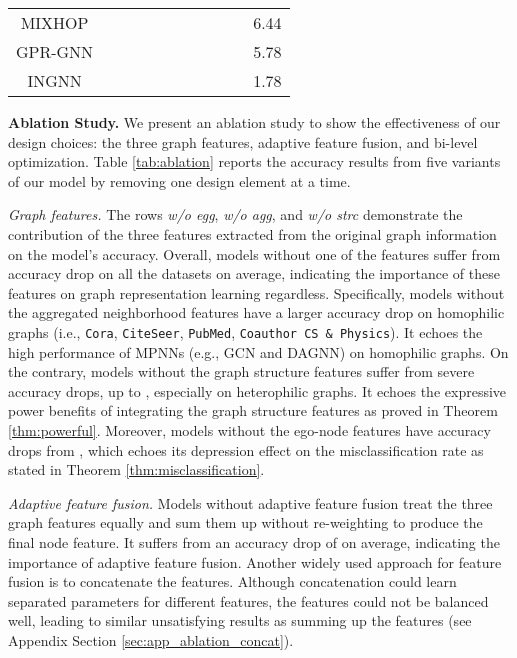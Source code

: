 \documentclass{article}
\theoremstyle{plain}
\newcommand{\pjn}{{INGNN}}
\newcommand{\mypar}[1]{{\vspace{0.05cm} \noindent \bf #1}}
\begin{document}
\begin{table*}[htb]
\begin{tabular}{c|ccccccccc|c}
MIXHOP    &     &     &     &  &     &     &     &     &     &  6.44      \\
GPR-GNN   &     &     &     &     &     & {\color[HTML]{0000FF} }    &     &     & {\color[HTML]{FF0000} } &   5.78     \\
\midrule
\pjn  &{\color[HTML]{FF0000} } & {\color[HTML]{0000FF} } & {\color[HTML]{0000FF} } &     & {\color[HTML]{FF0000} } & {\color[HTML]{FF0000} } & {\color[HTML]{FF0000} } & {\color[HTML]{FF0000} } & {\color[HTML]{0000FF} } & 1.78 \\
\bottomrule
\end{tabular}
\vspace{-10pt}
\end{table*}
  
\mypar{Ablation Study.} 
We present an ablation study to show the effectiveness of our design choices: the three graph features, adaptive feature fusion, and bi-level optimization. 
Table \ref{tab:ablation} reports the accuracy results from five variants of our model by removing one design element at a time. 


\textit{Graph features.} The rows \textit{w/o egg}, \textit{w/o agg}, and \textit{w/o strc} demonstrate the contribution of the three features extracted from the original graph information on the model's accuracy.
Overall, models without one of the features suffer from  accuracy drop on all the datasets on average, indicating the importance of these features on graph representation learning regardless.
Specifically, models without the aggregated neighborhood features have a larger accuracy drop on homophilic graphs (i.e., \texttt{Cora}, \texttt{CiteSeer}, \texttt{PubMed}, \texttt{Coauthor CS \& Physics}). It echoes the high performance of MPNNs (e.g., GCN and DAGNN) on homophilic graphs. 
On the contrary, models without the graph structure features suffer from severe accuracy drops, up to , especially on heterophilic graphs. It echoes the expressive power benefits of integrating the graph structure features as proved in Theorem \ref{thm:powerful}.   
Moreover, models without the ego-node features have accuracy drops from , which echoes its depression effect on the misclassification rate as stated in Theorem \ref{thm:misclassification}.

\textit{Adaptive feature fusion.} Models without adaptive feature fusion treat the three graph features equally and sum them up without re-weighting to produce the final node feature. It suffers from an accuracy drop of  on average, indicating the importance of adaptive feature fusion. Another widely used approach for feature fusion is to concatenate the features. Although concatenation could learn separated parameters for different features, the features could not be balanced well, leading to similar unsatisfying results as summing up the features (see Appendix Section \ref{sec:app_ablation_concat}). 
\end{document}
